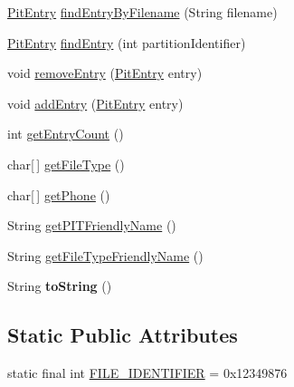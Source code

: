 \begin{DoxyCompactItemize}
\item 
\hyperlink{classcom_1_1casual__dev_1_1libpitX_1_1PitEntry}{Pit\-Entry} \hyperlink{classcom_1_1casual__dev_1_1libpitX_1_1PitData_a92fe9be410bfcab61b10c29f659f24d6}{find\-Entry\-By\-Filename} (String filename)
\item 
\hyperlink{classcom_1_1casual__dev_1_1libpitX_1_1PitEntry}{Pit\-Entry} \hyperlink{classcom_1_1casual__dev_1_1libpitX_1_1PitData_ac5502e3ad38ca61f482cbe7ade874c51}{find\-Entry} (int partition\-Identifier)
\item 
void \hyperlink{classcom_1_1casual__dev_1_1libpitX_1_1PitData_a5280856fe2d4817ef119bc0254930a14}{remove\-Entry} (\hyperlink{classcom_1_1casual__dev_1_1libpitX_1_1PitEntry}{Pit\-Entry} entry)
\item 
void \hyperlink{classcom_1_1casual__dev_1_1libpitX_1_1PitData_a9f10527e6928cb25b762774385d3513f}{add\-Entry} (\hyperlink{classcom_1_1casual__dev_1_1libpitX_1_1PitEntry}{Pit\-Entry} entry)
\item 
int \hyperlink{classcom_1_1casual__dev_1_1libpitX_1_1PitData_a2dd3520851fa62dc5cf1e074e8cd8082}{get\-Entry\-Count} ()
\item 
char\mbox{[}$\,$\mbox{]} \hyperlink{classcom_1_1casual__dev_1_1libpitX_1_1PitData_a2a8a3240829d811fd2634d06d7e8158c}{get\-File\-Type} ()
\item 
char\mbox{[}$\,$\mbox{]} \hyperlink{classcom_1_1casual__dev_1_1libpitX_1_1PitData_a7105805f388f6f876910a3c58e3148e0}{get\-Phone} ()
\item 
String \hyperlink{classcom_1_1casual__dev_1_1libpitX_1_1PitData_a05973f518f916ba846d60d7ea9228d41}{get\-P\-I\-T\-Friendly\-Name} ()
\item 
String \hyperlink{classcom_1_1casual__dev_1_1libpitX_1_1PitData_a5ecb1b13b460a24dce7299f88ad75d71}{get\-File\-Type\-Friendly\-Name} ()
\item 
\hypertarget{classcom_1_1casual__dev_1_1libpitX_1_1PitData_af38169ec50287b7b538e8c0729fb94fc}{String {\bfseries to\-String} ()}\label{classcom_1_1casual__dev_1_1libpitX_1_1PitData_af38169ec50287b7b538e8c0729fb94fc}

\end{DoxyCompactItemize}
\subsection*{Static Public Attributes}
\begin{DoxyCompactItemize}
\item 
static final int \hyperlink{classcom_1_1casual__dev_1_1libpitX_1_1PitData_aac62ade2b33051f8fcbf59e2b7117fb5}{F\-I\-L\-E\-\_\-\-I\-D\-E\-N\-T\-I\-F\-I\-E\-R} = 0x12349876
\end{DoxyCompactItemize}


